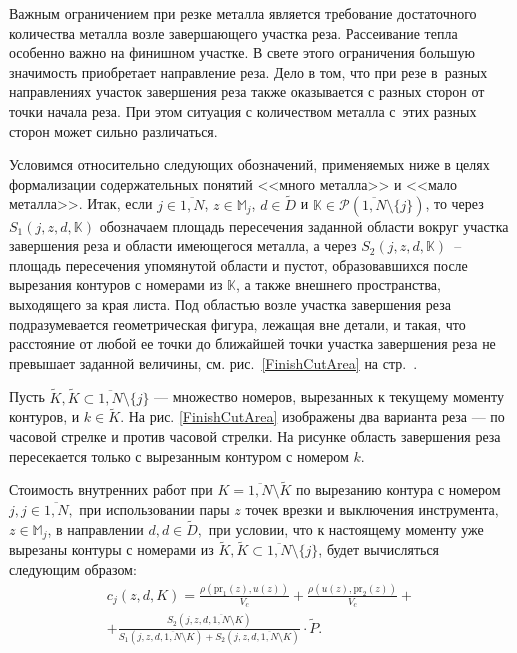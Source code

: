 Важным ограничением при резке металла является требование достаточного
количества металла возле завершающего участка реза.
Рассеивание тепла особенно важно на финишном участке.
В свете этого ограничения большую значимость приобретает направление реза.
Дело в том,
что при резе в~разных направлениях участок завершения реза
также оказывается с разных сторон от точки начала реза.
При этом ситуация с количеством металла
с~этих разных сторон может сильно различаться.

Условимся относительно следующих обозначений,
применяемых ниже в целях формализации
содержательных понятий <<много металла>> и <<мало металла>>.
Итак, если
$j\in \overline{1,N}$,
$z\in \mathbb{M}_j$,
$d\in \tilde{D}$ и
$\mathbb{K}\in \mathcal{P}(\overline{1,N}\setminus \{j\})$,
то через
$S_1(j,z,d,\mathbb{K})$ обозначаем площадь пересечения заданной
области вокруг участка завершения реза и области имеющегося металла,
а через
$S_2(j,z,d,\mathbb{K})$~-- площадь пересечения упомянутой области и пустот,
образовавшихся после вырезания контуров с номерами из $\mathbb{K}$,
а также внешнего пространства, выходящего за края листа.
Под областью возле участка завершения реза подразумевается геометрическая фигура,
лежащая вне детали, и такая,
что расстояние от любой ее точки до ближайшей точки участка
завершения реза не превышает заданной величины,
см. рис.~\ref{FinishCutArea}
на стр.~\pageref{FinishCutArea}.

Пусть
$\tilde{K}, \tilde{K}\subset \overline{1,N}\setminus \{j\}$
--- множество номеров, вырезанных к текущему моменту контуров,
и $k\in \tilde{K}$.
На рис. \ref{FinishCutArea}
изображены два варианта реза ---
по часовой стрелке и против часовой стрелки.
На рисунке область завершения реза пересекается только с вырезанным
контуром с номером $k$.

Стоимость внутренних работ
при $K=\overline{1,N}\setminus \tilde{K}$
по вырезанию контура с номером $j,j\in \overline{1,N},$
при использовании пары $z$ точек врезки и выключения инструмента,
$z\in \mathbb{M}_j$,
в направлении $d,d\in \tilde{D},$ при условии,
что к настоящему моменту уже вырезаны контуры с номерами из
$\tilde{K},\tilde{K}\subset \overline{1,N}\setminus \{j\}$,
будет вычисляться следующим образом:
\begin{equation}\label{IntPrice}
  \begin{array}{c}
  c_j(z,d,K)=\frac{\rho(\mbox{pr}_1(z),u(z))}{V_c}+
  \frac{\rho(u(z),\mbox{pr}_2(z))}{V_c}+\\
  +\frac{S_2(j,z,d,\overline{1,N}\setminus K)}{S_1(j,z,d,\overline{1,N}\setminus K)+
  S_2(j,z,d,\overline{1,N}\setminus K)}\cdot\tilde{P}
  .
  \end{array}
\end{equation}

